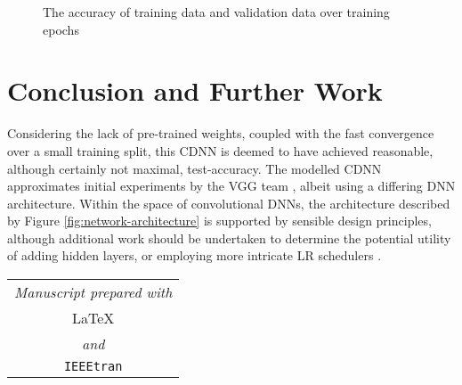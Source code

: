 \documentclass[journal]{IEEEtran}
\begin{document}
\begin{figure}
    \caption{The accuracy of training data and validation data over training
        epochs}%
    \label{fig:loss-plot}
\end{figure}

\section{Conclusion and Further Work}
Considering the lack of pre-trained weights, coupled with the fast convergence
over a small training split, this CDNN is deemed to have achieved reasonable,
although certainly not maximal, test-accuracy. The modelled CDNN approximates
initial experiments by the VGG team \cite{Nilsback:2008}, albeit using a
differing DNN architecture. Within the space of convolutional DNNs, the
architecture described by Figure \ref{fig:network-architecture} is supported by
sensible design principles, although additional work should be undertaken to
determine the potential utility of adding hidden layers, or employing more
intricate LR schedulers \cite{Loshchilov:2017}.



\vfill
\begin{center}
    \color{gray}%
    \begin{tabular}{c}
        \emph{Manuscript prepared with} \\[8pt]
        \huge\LaTeX \\[8pt]
        \emph{and} \\[8pt]
        \huge\texttt{IEEEtran}
    \end{tabular}
\end{center}
\end{document}
